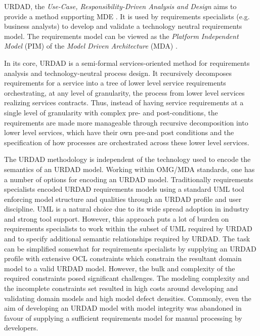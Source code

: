 URDAD, the {\em Use-Case, Responsibility-Driven Analysis and Design} \cite{solms_technology_2007} aims to provide a method supporting MDE \cite{solms_urdad_2010}. It is used by requirements specialists (e.g. business analysts) to develop and validate a technology neutral requirements model. The requirements model can be viewed as the {\em Platform Independent Model} (PIM) of the {\em Model Driven Architecture} (MDA) \cite{solms_urdad_2010}.

In its core, URDAD is a semi-formal services-oriented method for requirements analysis and technology-neutral process design. It recursively decomposes requirements for a service into a tree of lower level service requirements orchestrating, at any level of granularity, the process from lower level services realizing services contracts. Thus, instead of having service requirements at a single level of granularity with complex pre- and post-conditions, the requirements are made more manageable through recursive decomposition into lower level services, which have their own pre-and post conditions and the specification of how processes are orchestrated across these lower level services. 

The URDAD methodology is independent of the technology used to encode the semantics of an URDAD model. Working within OMG/MDA standards, one has a number of options for encoding an URDAD model. Traditionally requirements specialists encoded URDAD requirements models using a standard UML tool enforcing model structure and qualities through an URDAD profile and user discipline. UML is a natural choice due to its wide spread adoption in industry and strong tool support. However, this approach puts a lot of burden on requirements specialists to work within the subset of UML required by URDAD and to specify additional semantic relationships required by URDAD. The task can be simplified somewhat for requirements specialists by supplying an URDAD profile with extensive OCL constraints which constrain the resultant domain model to a valid URDAD model. However, the bulk and complexity of the required constraints posed significant challenges. The modeling complexity and the incomplete constraints set resulted in high costs around developing and validating domain models and high model defect densities. Commonly, even the aim of developing an URDAD model with model integrity was abandoned in favour of supplying a sufficient requirements model for manual processing by developers.

